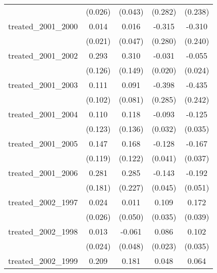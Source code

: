 {\begin{tabular}{l*{4}{c}}
            &     (0.026)         &     (0.043)         &     (0.282)         &     (0.238)         \\
[1em]
treated\_2001\_2000&       0.014         &       0.016         &      -0.315         &      -0.310         \\
            &     (0.021)         &     (0.047)         &     (0.280)         &     (0.240)         \\
[1em]
treated\_2001\_2002&       0.293\sym{*}  &       0.310\sym{*}  &      -0.031         &      -0.055\sym{*}  \\
            &     (0.126)         &     (0.149)         &     (0.020)         &     (0.024)         \\
[1em]
treated\_2001\_2003&       0.111         &       0.091         &      -0.398         &      -0.435         \\
            &     (0.102)         &     (0.081)         &     (0.285)         &     (0.242)         \\
[1em]
treated\_2001\_2004&       0.110         &       0.118         &      -0.093\sym{**} &      -0.125\sym{***}\\
            &     (0.123)         &     (0.136)         &     (0.032)         &     (0.035)         \\
[1em]
treated\_2001\_2005&       0.147         &       0.168         &      -0.128\sym{**} &      -0.167\sym{***}\\
            &     (0.119)         &     (0.122)         &     (0.041)         &     (0.037)         \\
[1em]
treated\_2001\_2006&       0.281         &       0.285         &      -0.143\sym{**} &      -0.192\sym{***}\\
            &     (0.181)         &     (0.227)         &     (0.045)         &     (0.051)         \\
[1em]
treated\_2002\_1997&       0.024         &       0.011         &       0.109\sym{**} &       0.172\sym{***}\\
            &     (0.026)         &     (0.050)         &     (0.035)         &     (0.039)         \\
[1em]
treated\_2002\_1998&       0.013         &      -0.061         &       0.086\sym{***}&       0.102\sym{**} \\
            &     (0.024)         &     (0.048)         &     (0.023)         &     (0.035)         \\
[1em]
treated\_2002\_1999&       0.209         &       0.181         &       0.048\sym{*}  &       0.064         \\

\end{tabular}}
